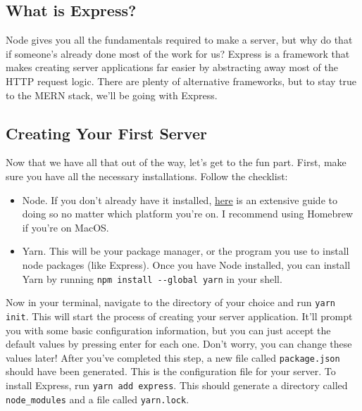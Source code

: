\subsection*{What is Express?}

Node gives you all the fundamentals required to make a server, but why do that if someone's already done most of the work for us? Express is a framework that makes creating server applications far easier by abstracting away most of the HTTP request logic. There are plenty of alternative frameworks, but to stay true to the MERN stack, we'll be going with Express.

\subsection*{Creating Your First Server}

Now that we have all that out of the way, let's get to the fun part. First, make sure you have all the necessary installations. Follow the checklist:

\begin{itemize}
    \item Node. If you don't already have it installed, \href{https://nodejs.org/en/download/package-manager/#macos}{here} is an extensive guide to doing so no matter which platform you're on. I recommend using Homebrew if you're on MacOS.
    \item Yarn. This will be your package manager, or the program you use to install node packages (like Express). Once you have Node installed, you can install Yarn by running \texttt{npm install -{}-global yarn} in your shell. 
\end{itemize}

Now in your terminal, navigate to the directory of your choice and run \texttt{yarn init}. This will start the process of creating your server application. It'll prompt you with some basic configuration information, but you can just accept the default values by pressing enter for each one. Don't worry, you can change these values later! After you've completed this step, a new file called \texttt{package.json} should have been generated. This is the configuration file for your server. To install Express, run \texttt{yarn add express}. This should generate a directory called \texttt{node\_modules} and a file called \texttt{yarn.lock}.

